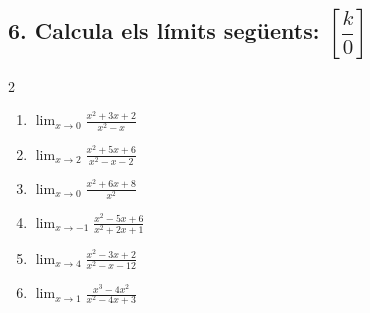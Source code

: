 \documentclass[12pt,a4paper]{article}
\begin{document}
\subsection*{6. Calcula els límits següents: $\left[\dfrac{k}{0}\right]$}
\begin{multicols}{2}
\begin{enumerate}[label=6.\arabic*.]
    \item $\displaystyle \lim_{x \to 0} \frac{x^2+3x+2}{x^2-x}$
    \item $\displaystyle \lim_{x \to 2} \frac{x^2+5x+6}{x^2-x-2}$
    \item $\displaystyle \lim_{x \to 0} \frac{x^2+6x+8}{x^2}$
    \item $\displaystyle \lim_{x \to -1} \frac{x^2-5x+6}{x^2+2x+1}$
    \item $\displaystyle \lim_{x \to 4} \frac{x^2-3x+2}{x^2-x-12}$
    \item $\displaystyle \lim_{x \to 1} \frac{x^3-4x^2}{x^2-4x+3}$
\end{enumerate}
\end{multicols}

\end{document}
